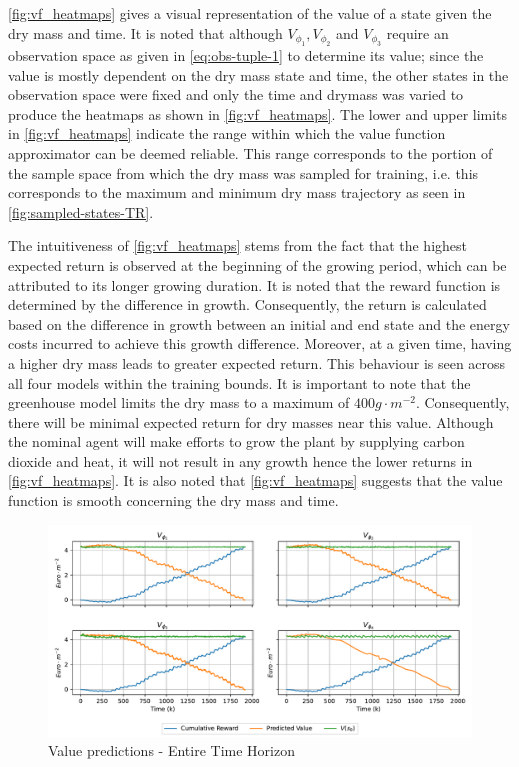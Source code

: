 \autoref{fig:vf_heatmaps} gives a visual representation of the value of a state given the dry mass and time. It is noted that although $V_{\phi_1},V_{\phi_2}$ and $V_{\phi_3}$ require an observation space as given in \autoref{eq:obs-tuple-1} to determine its value; since the value is mostly dependent on the dry mass state and time, the other states in the observation space were fixed and only the time and drymass was varied to produce the heatmaps as shown in \autoref{fig:vf_heatmaps}. The lower and upper limits in  \autoref{fig:vf_heatmaps} indicate the range within which the value function approximator can be deemed reliable. This range corresponds to the portion of the sample space from which the dry mass was sampled for training, i.e. this corresponds to the maximum and minimum dry mass trajectory as seen in \autoref{fig:sampled-states-TR}.

The intuitiveness of \autoref{fig:vf_heatmaps} stems from the fact that the highest expected return is observed at the beginning of the growing period, which can be attributed to its longer growing duration. It is noted that the reward function is determined by the difference in growth. Consequently, the return is calculated based on the difference in growth between an initial and end state and the energy costs incurred to achieve this growth difference. Moreover, at a given time, having a higher dry mass leads to greater expected return. This behaviour is seen across all four models within the training bounds. It is important to note that the greenhouse model limits the dry mass to a maximum of $400 g \cdot m^{-2}$. Consequently, there will be minimal expected return for dry masses near this value. Although the nominal agent will make efforts to grow the plant by supplying carbon dioxide and heat, it will not result in any growth hence the lower returns in \autoref{fig:vf_heatmaps}.  It is also noted that \autoref{fig:vf_heatmaps} suggests that the value function is smooth concerning the dry mass and time.

\begin{figure}[H]
	\centering
	\includegraphics[width = \textwidth]{figures/vf_time_predictions_long.pdf}
	\caption{Value predictions - Entire Time Horizon}
	\label{fig:tr_predictions_long}
\end{figure}

